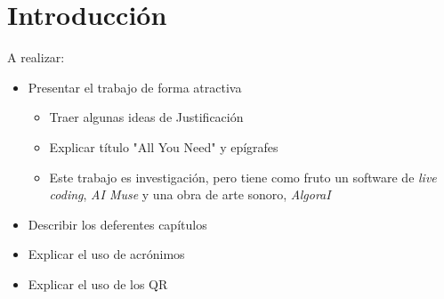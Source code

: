 \chapter{Introducción}


A realizar:
\begin{itemize}
    \item Presentar el trabajo de forma atractiva
    \begin{itemize}
        \item Traer algunas ideas de Justificación
        \item Explicar título "All You Need" y epígrafes
        \item Este trabajo es investigación, pero tiene como fruto un software de \textit{live coding}, \textit{AI Muse} y una obra de arte sonoro, \textit{AlgoraI}
    \end{itemize}
    \item Describir los deferentes capítulos
    \item Explicar el uso de acrónimos
    \item Explicar el uso de los QR
\end{itemize}








